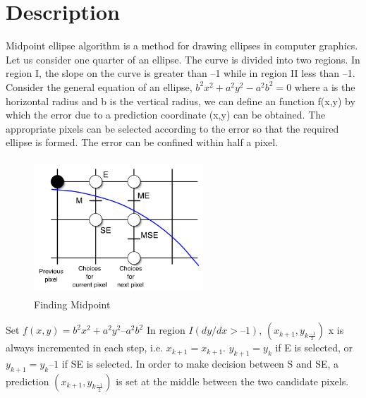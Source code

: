 \documentclass[11pt]{report}
\begin{document}
\section{Description}
Midpoint ellipse algorithm is a method for drawing ellipses in computer graphics. Let us consider one quarter of an ellipse. The curve is divided into two regions. In region I, the slope on the curve is greater than –1 while in region II less than –1. Consider the general equation of an ellipse, 
$b^2x^2 + a^2y^2 - a^2b^2 = 0$
where a is the horizontal radius and b is the vertical radius, we can define an function f(x,y) by which the error due to a prediction coordinate (x,y) can be obtained. The appropriate pixels can be selected according to the error so that the required ellipse is formed. The error can be confined within half a pixel.

\begin{figure}[h]
	\centering
	\includegraphics[height=2.0in,width=2.5in]{midPoint}
	\caption{Finding Midpoint}	
\end{figure}

Set $f(x,y) = b^2x^2 + a^2y^2 – a^2b^2$
\newline In region $I (dy/dx > –1)$,
$(x_{k+1}, y_{k\frac{-1}{2}})$
\newline
x is always incremented in each step, i.e. $x_{k+1} = x_{k + 1}$. $y_{k+1} = y_k$ if E is selected, or $y_{k+1} = y_k – 1$ if SE is selected. In order to make decision between S and SE, a prediction $(x_{k+1}, y_{k\frac{-1}{2}})$ is set at the middle between the two candidate pixels.
\end{document}
